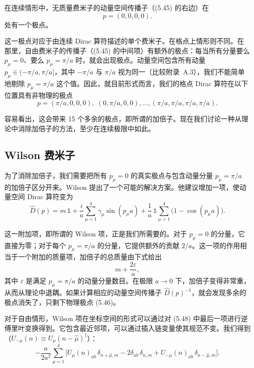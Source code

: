 在连续情形中，无质量费米子的动量空间传播子（(5.45) 的右边）在
\begin{equation}
  p = (0, 0, 0, 0) .
\end{equation}
处有一个极点。

这一极点对应于由连续 Dirac 算符描述的单个费米子。在格点上情形则不同。在那里，自由费米子的传播子（(5.45) 的中间项）有额外的极点：每当所有分量要么 $p_\mu = 0$、要么 $p_\mu = \pi/a$ 时，就会出现极点。动量空间包含所有动量 $p_\mu \in (-\pi/a, \pi/a]$，其中 $-\pi/a$ 与 $\pi/a$ 视为同一（比较附录~A.3），我们不能简单地剔除 $p_\mu = \pi/a$ 这个值。因此，就目前形式而言，我们的格点 Dirac 算符在以下位置具有非物理的极点
\begin{equation}
  p = (\pi/a, 0, 0, 0), \;(0, \pi/a, 0, 0), \ldots, (\pi/a, \pi/a, \pi/a, \pi/a) .
\end{equation}

容易看出，这会带来 15 个多余的极点，即所谓的加倍子。现在我们讨论一种从理论中消除加倍子的方法，至少在连续极限中如此。

\subsection{Wilson 费米子}

为了消除加倍子，我们需要把所有 $p_\mu = 0$ 的真实极点与包含动量分量 $p_\mu = \pi/a$ 的加倍子区分开来。Wilson 提出了一个可能的解决方案。他建议增加一项，使动量空间 Dirac 算符变为
\begin{equation}
  \hat{D}(p) = m\,\mathbb{1} + \frac{i}{a}\sum_{\mu=1}^{4}\gamma_\mu\sin(p_\mu a)
    + \frac{1}{a}\,\mathbb{1}\sum_{\mu=1}^{4}\big(1 - \cos(p_\mu a)\big) .
\end{equation}

这一附加项，即所谓的 Wilson 项，正是我们所需要的。对于 $p_\mu = 0$ 的分量，它直接为零；对于每个 $p_\mu = \pi/a$ 的分量，它提供额外的贡献 $2/a$。这一项的作用相当于一个附加的质量项，加倍子的总质量由下式给出
\begin{equation}
  m + \frac{2\varepsilon}{a} ,
\end{equation}
其中 $\varepsilon$ 是满足 $p_\mu = \pi/a$ 的动量分量数目。在极限 $a \to 0$ 下，加倍子变得非常重，从而从理论中退耦。如果计算相应的动量空间传播子 $\hat{D}(p)^{-1}$，就会发现多余的极点消失了，只剩下物理极点 (5.46)。

对于自由情形，Wilson 项在坐标空间的形式可以通过对 (5.48) 中最后一项进行逆傅里叶变换得到。它包含最近邻项，可以通过插入链变量使其规范不变。我们得到（$U_{-\mu}(n) \equiv U_\mu(n-\hat{\mu})^\dagger$）：
\begin{equation}
  -\frac{a}{2a^2}\sum_{\mu=1}^{4}\Big[
    U_\mu(n)_{ab}\,\delta_{n+\hat{\mu},m} - 2\delta_{ab}\,\delta_{n,m}
    + U_{-\mu}(n)_{ab}\,\delta_{n-\hat{\mu},m}\Big] .
\end{equation}

